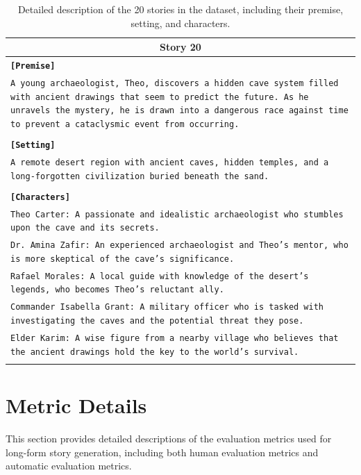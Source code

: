 \documentclass[letterpaper]{article} %
\begin{document}
\begin{small}
\begin{longtable}{p{\textwidth}}
    \multicolumn{1}{c}{\textbf{Story 20}} \\
    \midrule
    \texttt{\textbf{[Premise]}} \\
    \texttt{A young archaeologist, Theo, discovers a hidden cave system filled with ancient drawings that seem to predict the future. As he unravels the mystery, he is drawn into a dangerous race against time to prevent a cataclysmic event from occurring.} \\\\
    \texttt{\textbf{[Setting]}} \\
    \texttt{A remote desert region with ancient caves, hidden temples, and a long-forgotten civilization buried beneath the sand.} \\\\
    \texttt{\textbf{[Characters]}} \\
    \texttt{Theo Carter: A passionate and idealistic archaeologist who stumbles upon the cave and its secrets.} \\
    \texttt{Dr. Amina Zafir: An experienced archaeologist and Theo's mentor, who is more skeptical of the cave's significance.} \\
    \texttt{Rafael Morales: A local guide with knowledge of the desert's legends, who becomes Theo's reluctant ally.} \\
    \texttt{Commander Isabella Grant: A military officer who is tasked with investigating the caves and the potential threat they pose.} \\
    \texttt{Elder Karim: A wise figure from a nearby village who believes that the ancient drawings hold the key to the world's survival.} \\
    \bottomrule

    \caption{Detailed description of the 20 stories in the dataset, including their premise, setting, and characters.}
    \label{tab:dataset_20_stories}
  \end{longtable}
\end{small}

\twocolumn

\section{Metric Details}
\label{sec:metric_details}

This section provides detailed descriptions of the evaluation metrics used for long-form story generation, including both human evaluation metrics and automatic evaluation metrics.
\end{document}
